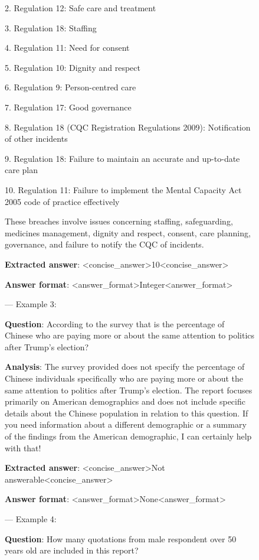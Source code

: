 \begin{figure}[htbp]
\begin{tcolorbox}[title=The answer extracting prompt used to make long response concise during evaluation,colback=gray!5,colframe=gray!75!gray]
{2. Regulation 12: Safe care and treatment

3. Regulation 18: Staffing

4. Regulation 11: Need for consent

5. Regulation 10: Dignity and respect

6. Regulation 9: Person-centred care

7. Regulation 17: Good governance

8. Regulation 18 (CQC Registration Regulations 2009): Notification of other incidents

9. Regulation 18: Failure to maintain an accurate and up-to-date care plan

10. Regulation 11: Failure to implement the Mental Capacity Act 2005 code of practice effectively

These breaches involve issues concerning staffing, safeguarding, medicines management, dignity and respect, consent, care planning, governance, and failure to notify the CQC of incidents.

\textbf{Extracted answer}: <concise\_answer>10<\/concise\_answer>

\textbf{Answer format}: <answer\_format>Integer<\/answer\_format>

\vspace{0.2cm}

--- Example 3:

\textbf{Question}: According to the survey that is the percentage of Chinese who are paying more or about the same attention to politics after Trump’s election?

\textbf{Analysis}: The survey provided does not specify the percentage of Chinese individuals specifically who are paying more or about the same attention to politics after Trump’s election. The report focuses primarily on American demographics and does not include specific details about the Chinese population in relation to this question. If you need information about a different demographic or a summary of the findings from the American demographic, I can certainly help with that!

\textbf{Extracted answer}: <concise\_answer>Not answerable<\/concise\_answer>

\textbf{Answer format}: <answer\_format>None<\/answer\_format>

\vspace{0.2cm}

--- Example 4:

\textbf{Question}: How many quotations from male respondent over 50 years old are included in this report?

}
\end{tcolorbox}
\end{figure}
